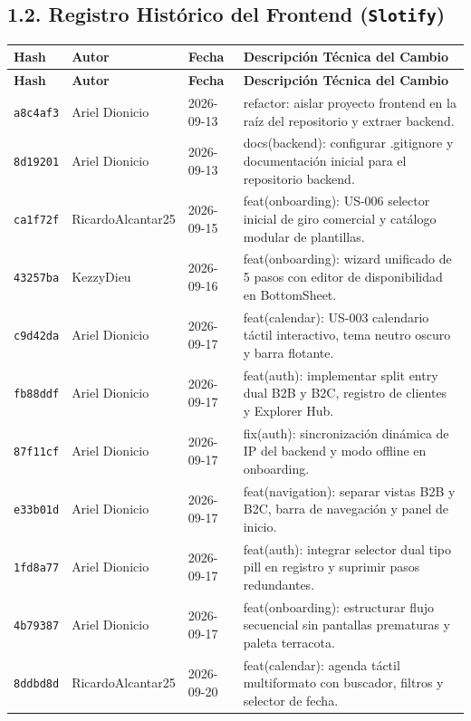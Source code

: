 \documentclass[11pt,letterpaper]{article}
\begin{document}
\subsection{1.2. Registro Histórico del Frontend (\texttt{Slotify})}
\begin{longtable}{L{1.5cm} L{3.2cm} C{2.1cm} L{9.0cm}}
\toprule
\textbf{Hash} & \textbf{Autor} & \textbf{Fecha} & \textbf{Descripción Técnica del Cambio} \\
\midrule
\endfirsthead
\toprule
\textbf{Hash} & \textbf{Autor} & \textbf{Fecha} & \textbf{Descripción Técnica del Cambio} \\
\midrule
\endhead

\texttt{a8c4af3} & Ariel Dionicio & 2026-09-13 & refactor: aislar proyecto frontend en la raíz del repositorio y extraer backend. \\
\texttt{8d19201} & Ariel Dionicio & 2026-09-13 & docs(backend): configurar .gitignore y documentación inicial para el repositorio backend. \\
\texttt{ca1f72f} & RicardoAlcantar25 & 2026-09-15 & feat(onboarding): US-006 selector inicial de giro comercial y catálogo modular de plantillas. \\
\texttt{43257ba} & KezzyDieu & 2026-09-16 & feat(onboarding): wizard unificado de 5 pasos con editor de disponibilidad en BottomSheet. \\
\texttt{c9d42da} & Ariel Dionicio & 2026-09-17 & feat(calendar): US-003 calendario táctil interactivo, tema neutro oscuro y barra flotante. \\
\texttt{fb88ddf} & Ariel Dionicio & 2026-09-17 & feat(auth): implementar split entry dual B2B y B2C, registro de clientes y Explorer Hub. \\
\texttt{87f11cf} & Ariel Dionicio & 2026-09-17 & fix(auth): sincronización dinámica de IP del backend y modo offline en onboarding. \\
\texttt{e33b01d} & Ariel Dionicio & 2026-09-17 & feat(navigation): separar vistas B2B y B2C, barra de navegación y panel de inicio. \\
\texttt{1fd8a77} & Ariel Dionicio & 2026-09-17 & feat(auth): integrar selector dual tipo pill en registro y suprimir pasos redundantes. \\
\texttt{4b79387} & Ariel Dionicio & 2026-09-17 & feat(onboarding): estructurar flujo secuencial sin pantallas prematuras y paleta terracota. \\
\texttt{8ddbd8d} & RicardoAlcantar25 & 2026-09-20 & feat(calendar): agenda táctil multiformato con buscador, filtros y selector de fecha. \\

\end{longtable}
\end{document}

